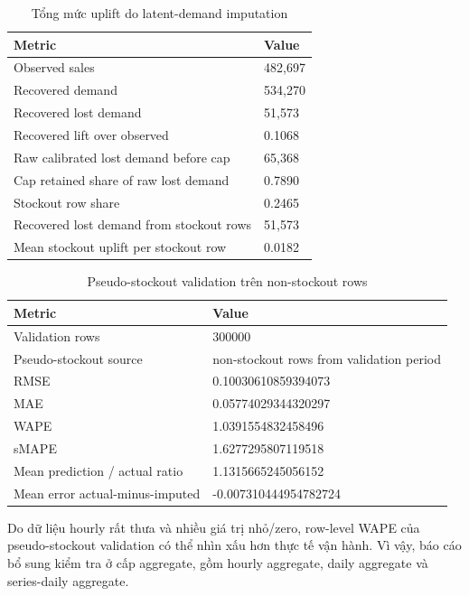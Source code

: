 \documentclass[12pt,a4paper]{article}
\begin{document}
\begin{table}[H]
\centering
\caption{Tổng mức uplift do latent-demand imputation}
\begin{tabular}{ll}
\toprule
Metric & Value \\
\midrule
Observed sales & 482,697 \\
Recovered demand & 534,270 \\
Recovered lost demand & 51,573 \\
Recovered lift over observed & 0.1068 \\
Raw calibrated lost demand before cap & 65,368 \\
Cap retained share of raw lost demand & 0.7890 \\
Stockout row share & 0.2465 \\
Recovered lost demand from stockout rows & 51,573 \\
Mean stockout uplift per stockout row & 0.0182 \\
\bottomrule
\end{tabular}
\end{table}

\begin{table}[H]
\centering
\caption{Pseudo-stockout validation trên non-stockout rows}
\begin{tabular}{ll}
\toprule
Metric & Value \\
\midrule
Validation rows & 300000 \\
Pseudo-stockout source & non-stockout rows from validation period \\
RMSE & 0.10030610859394073 \\
MAE & 0.05774029344320297 \\
WAPE & 1.0391554832458496 \\
sMAPE & 1.6277295807119518 \\
Mean prediction / actual ratio & 1.1315665245056152 \\
Mean error actual-minus-imputed & -0.007310444954782724 \\
\bottomrule
\end{tabular}
\end{table}

Do dữ liệu hourly rất thưa và nhiều giá trị nhỏ/zero, row-level WAPE của pseudo-stockout validation có thể nhìn xấu hơn thực tế vận hành.
Vì vậy, báo cáo bổ sung kiểm tra ở cấp aggregate, gồm hourly aggregate, daily aggregate và series-daily aggregate.

\begin{table}[H]
\centering
\caption{Pseudo-stockout validation ở các cấp aggregate}
\end{table}
\end{document}
